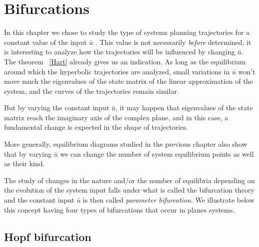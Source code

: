 
\section{Bifurcations}

In this chapter we chose to study the type of systems planning trajectories for a constant 
value of the input $\bar u$ . This value is not necessarily {\em before} determined, 
it is interesting to analyze how the trajectories will be influenced by changing $\bar u$.
The theorem ~\ref{Hart} already gives us an indication. As long as the equilibrium around
which the hyperbolic trajectories are analyzed, small variations in $\bar u$
won't move much the eigenvalues of the state matrix of the linear approximation
of the system, and the curves of the trajectories remain similar.

But by varying the constant input $\bar u$, it may happen that eigenvalues of the state matrix 
reach the imaginary axis of the complex plane, and
in this case, a fundamental change is expected in the shape of trajectories.

More generally, equilibrium diagrams studied in the previous chapter also show that by
varying $\bar u$ we can change the number of system equilibrium points as well as their kind.

The study of changes in the nature and/or the number of
equilibria depending on the evolution of the system input
falls under what is called the bifurcation theory and the constant input $\bar u$ is then
called {\em parameter bifurcation}. We illustrate below this concept
having four types of bifurcations that occur in planes systems.

\subsection{Hopf bifurcation}


